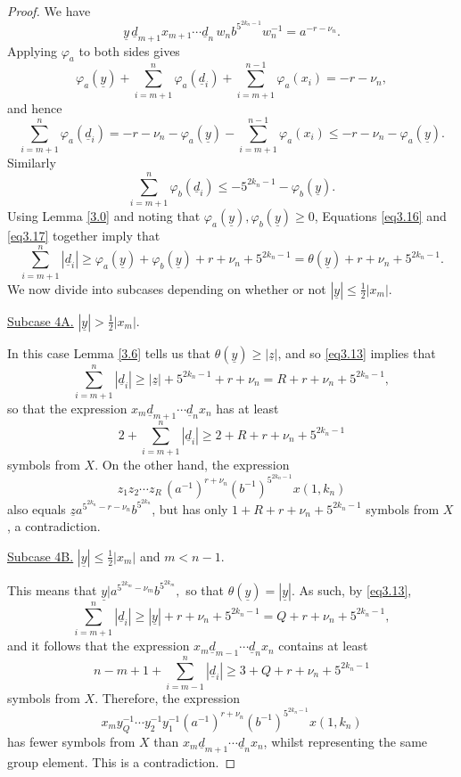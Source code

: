 \documentclass[twoside,11pt]{amsart}
\numberwithin{equation}{section}
\theoremstyle{definition}
\newcommand{\1}{\mathbbm{1}}
\newcommand{\pdt}{\underline}
\begin{document}
\begin{proof}
		We have
		$$\pdt{y} \, \pdt{d}_{m+1} x_{m+1} \cdots \pdt{d}_n  \, w_n b^{5^{2k_n-1}} w_n^{-1} = a^{-r - \nu_n}.$$
		Applying $\varphi_a$ to both sides gives
		$$\varphi_a(\pdt{y})  + \sum_{i=m+1}^n \varphi_a(\pdt{d}_i) + \sum_{i=m+1}^{n-1} \varphi_a(x_i)  = -r - \nu_n,$$
		and hence
		\begin{equation}		\label{eq3.16}
			\sum_{i=m+1}^n \varphi_a(\pdt{d}_i) = -r -\nu_n -\varphi_a(\pdt{y}) -\sum_{i=m+1}^{n-1} \varphi_a(x_i) \leq -r -\nu_n - \varphi_a(\pdt{y}). 
		\end{equation} 
		Similarly 
		\begin{equation}		\label{eq3.17}
			\sum_{i=m+1}^n \varphi_b(\pdt{d}_i) \leq -5^{2k_n-1} - \varphi_b(\pdt{y}).
		\end{equation}
		Using Lemma \ref{3.0} and noting that $\varphi_a(\pdt{y}), \varphi_b(\pdt{y}) \geq 0$, Equations \eqref{eq3.16} and \eqref{eq3.17} together imply that 
		\begin{equation}		\label{eq3.13}
			\sum_{i=m+1}^n |\pdt{d}_i| \geq \varphi_a(\pdt{y}) + \varphi_b(\pdt{y})  +r +\nu_n + 5^{2k_n-1} = \theta(\pdt{y})  +r +\nu_n + 5^{2k_n-1}.
		\end{equation}
		We now divide into subcases depending on whether or not $|\pdt{y}|\leq \frac{1}{2}|x_m|$.
		
		
		\vskip 2mm
		\noindent
		\underline{Subcase 4A.} $|\pdt{y}| > \frac{1}{2}|x_m|$.
		
		In this case Lemma \ref{3.6} tells us that $\theta(\pdt{y}) \geq |\pdt{z}|$, and so \eqref{eq3.13} implies that 
		$$\sum_{i=m+1}^n |\pdt{d}_i| \geq |\pdt{z}| + 5^{2k_n-1} + r +\nu_n = R  + r +\nu_n + 5^{2k_n-1} ,$$
		so that the expression $x_m \pdt{d}_{m+1} \cdots \pdt{d}_n x_n$ has at least 
		$$2 + \sum_{i=m+1}^n |\pdt{d}_i| \geq 2+ R + r +\nu_n + 5^{2k_n-1}$$
		symbols from $X$. 	
		On the other hand, the expression
		$$z_1 z_2 \cdots z_R \, (a^{-1})^{r+\nu_n} (b^{-1})^{5^{2k_n-1}} x(1, k_n)$$
		also equals $\pdt{z} a^{5^{2k_n}-r - \nu_n}b^{5^{2k_n}}$, but has only $1+ R + r +\nu_n + 5^{2k_n-1}$ symbols from $X$, a contradiction.
			
		\vskip 2mm
		\noindent
		\underline{Subcase 4B.} $|\pdt{y}| \leq \frac{1}{2}|x_m|$  and $m<n-1$.
		
		This means that $\pdt{y} | a^{5^{2k_m} - \nu_m} b^{5^{2k_m}},$ so that $\theta(\pdt{y}) = |\pdt{y}|$. As such, by \eqref{eq3.13},
		$$ \sum_{i=m+1}^n |\pdt{d}_i| \geq |\pdt{y}| + r + \nu_n + 5^{2k_n-1} = Q + r + \nu_n + 5^{2k_n-1}  ,$$
		and it follows that the expression $x_m \pdt{d}_{m-1} \cdots \pdt{d}_n x_n$ contains at least 
		$$n-m + 1 + \sum_{i = m-1}^n|\pdt{d}_i| \geq  3 + Q + r + \nu_n + 5^{2k_n-1}$$
		symbols from $X$.
		Therefore, the expression
		$$x_m y_Q^{-1} \cdots y_2^{-1} y_1^{-1}(a^{-1})^{r + \nu_n} (b^{-1})^{5^{2k_n-1}} x(1, k_n)$$
		has fewer symbols from $X$ than $x_m \pdt{d}_{m+1} \cdots \pdt{d}_n x_n$, whilst representing the same group element. This is a contradiction. 
		

\end{proof}
\end{document}
